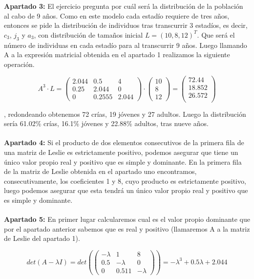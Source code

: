 \documentclass{article}
\begin{document}
\textbf{Apartado 3:}
El ejercicio pregunta por cuál será la distribución de la población al cabo de 9 años. Como en este modelo cada estadío requiere de tres años, entonces se pide la distribución de individuos tras transcurrir 3 estadíos, es decir, $c_3$, $j_3$ y $a_3$, con distribución de tamaños inicial $L=(10,8,12)^T$. Que será el número de individuas en cada estadío para al transcurrir 9 años. Luego llamando A a la expresión matricial obtenida en el apartado 1 realizamos la siguiente operación.

\begin{equation}
A^3 \cdot L =
\begin{pmatrix}
2.044 & 0.5 & 4 \\
0.25 & 2.044 & 0 \\
0 & 0.2555 & 2.044
\end{pmatrix}
\cdot 
\begin{pmatrix}
10 \\
8 \\
12 
\end{pmatrix}
=
\begin{pmatrix}
72.44 \\
18.852 \\
26.572 \\
\end{pmatrix}
\end{equation}

, redondeando obtenemos 72 crías, 19 jóvenes y 27 adultos. Luego la distribución sería 61.02\% crías, 16.1\% jóvenes y 22.88\% adultos, tras nueve años. \\ \\

\textbf{Apartado 4:} Si el producto de dos elementos consecutivos de la primera fila de una matriz de Leslie es estrictamente positivo, podemos asegurar que tiene un único valor propio real y positivo que es simple y dominante. En la primera fila de la matriz de Leslie obtenida en el apartado uno encontramos, consecutivamente, los coeficientes 1 y 8, cuyo producto es estrictamente positivo, luego podemos asegurar que esta tendrá un único valor propio real y positivo que es simple y dominante. \\ \\

\textbf{Apartado 5:} En primer lugar calcularemos cual es el valor propio dominante que por el apartado anterior sabemos que es real y positivo (llamaremos A a la matriz de Leslie del apartado 1).

\begin{equation*}
det(A - \lambda I)=det(
\begin{pmatrix}
-\lambda & 1 & 8 \\
0.5 & -\lambda & 0 \\
0 & 0.511 & -\lambda
\end{pmatrix}
)=-\lambda^3+0.5\lambda+2.044
\end{equation*}
\end{document}
